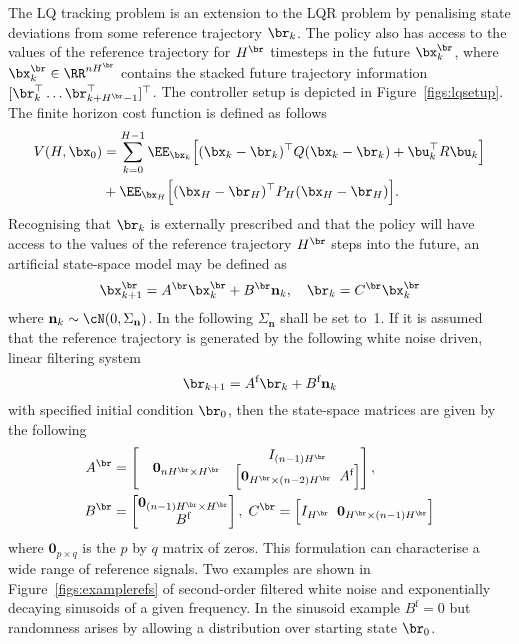 The LQ tracking problem is an extension to the LQR problem by penalising state deviations from some reference trajectory $\br_k$. The policy also has access to the values of the reference trajectory for $H^{\br}$ timesteps in the future $\bx^{\br}_k$, where $\bx^{\br}_k \in \RR^{nH^{\br}}$ contains the stacked future trajectory information $[\br_k^\top \dots \br_{k+H^{\br}-1}^\top]^\top$. The controller setup is depicted in Figure~\ref{figs:lqsetup}. The finite horizon cost function is defined as follows
\begin{align}
\nonumber V (H,\bx_0) 
&= \sum_{k=0}^{H-1} \EE_{\bx_k}\Big[ (\bx_k-\br_k)^\top Q (\bx_k-\br_k) + \bu_k^\top R \bu_k \Big] \\
&+ \EE_{\bx_H}\Big[(\bx_H-\br_H)^\top P_H (\bx_H-\br_H) \Big].
\end{align}
Recognising that $\br_k$ is externally prescribed and that the policy will have access to the values of the reference trajectory $H^{\br}$ steps into the future, an artificial state-space model may be defined as
\begin{equation}
\bx^{\br}_{k+1} = A^{\br}\bx^{\br}_k + B^{\br} \mathbf{n}_k, \quad
\br_k = C^{\br} \bx^{\br}_{k}   \label{eqn:refsys} 
\end{equation}
where $\mathbf{n}_k \sim \cN(0,\Sigma_{\mathbf{n}})$. In the following $\Sigma_{\mathbf{n}}$ shall be set to~1. If it is assumed that the reference trajectory is generated by the following white noise driven, linear filtering system
\begin{equation}
\br_{k+1} = A^{\text{f}}\br_k + B^{\text{f}} \mathbf{n}_k
\label{eqn:linfil}
\end{equation}
with specified initial condition $\br_0$, then the state-space matrices are given by the following
\begin{align}
\nonumber A^{\br} &= \begin{bmatrix} 
\quad\mathbf{0}_{nH^{\br}\times H^{\br}} & \begin{matrix} I_{(n-1)H^{\br}} \\
 \Big[\mathbf{0}_{H^{\br} \times (n-2)H^{\br}}\;\; A^{\text{f}}\Big] \end{matrix}
\end{bmatrix}, \\
\nonumber B^{\br} &= \begin{bmatrix} \mathbf{0}_{(n-1)H^{\br}\times H^{\br}}  \\ B^{\text{f}} \end{bmatrix} , \;
 C^{\br} = \Big[I_{H^{\br}} \;\; \mathbf{0}_{H^{\br}\times (n-1)H^{\br}}\Big] 
\end{align}
where $\mathbf{0}_{p\times q}$ is the $p$ by $q$ matrix of zeros. This formulation can characterise a wide range of reference signals. Two examples are shown in Figure~\ref{figs:examplerefs} of second-order filtered white noise and exponentially decaying sinusoids of a given frequency. In the sinusoid example $B^{\text{f}}=0$ but randomness arises by allowing a distribution over starting state $\br_0$.

